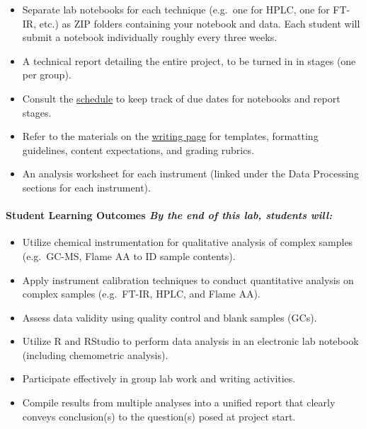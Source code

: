 \documentclass[]{tufte-book}
\providecommand{\tightlist}{%
  \setlength{\itemsep}{0pt}\setlength{\parskip}{0pt}}
\begin{document}
\begin{itemize}
\tightlist
\item
  Separate lab notebooks for each technique (e.g.~one for HPLC, one for FT-IR, etc.) as ZIP folders containing your notebook and data. Each student will submit a notebook individually roughly every three weeks.
\item
  A technical report detailing the entire project, to be turned in in stages (one per group).
\item
  Consult the \href{/chem370/schedule}{schedule} to keep track of due dates for notebooks and report stages.\\
\item
  Refer to the materials on the \href{/chem370/writing}{writing page} for templates, formatting guidelines, content expectations, and grading rubrics.
\item
  An analysis worksheet for each instrument (linked under the Data Processing sections for each instrument).
\end{itemize}

\hypertarget{student-learning-outcomes-by-the-end-of-this-lab-students-will-4}{%
\paragraph{\texorpdfstring{\textbf{Student Learning Outcomes} \textbar{} \emph{By the end of this lab, students will:}}{Student Learning Outcomes \textbar{} By the end of this lab, students will:}}\label{student-learning-outcomes-by-the-end-of-this-lab-students-will-4}}

\begin{itemize}
\tightlist
\item
  Utilize chemical instrumentation for qualitative analysis of complex samples (e.g.~GC-MS, Flame AA to ID sample contents).\\
\item
  Apply instrument calibration techniques to conduct quantitative analysis on complex samples (e.g.~FT-IR, HPLC, and Flame AA).\\
\item
  Assess data validity using quality control and blank samples (GCs).\\
\item
  Utilize R and RStudio to perform data analysis in an electronic lab notebook (including chemometric analysis).\\
\item
  Participate effectively in group lab work and writing activities.\\
\item
  Compile results from multiple analyses into a unified report that clearly conveys conclusion(s) to the question(s) posed at project start.
\end{itemize}
\end{document}
